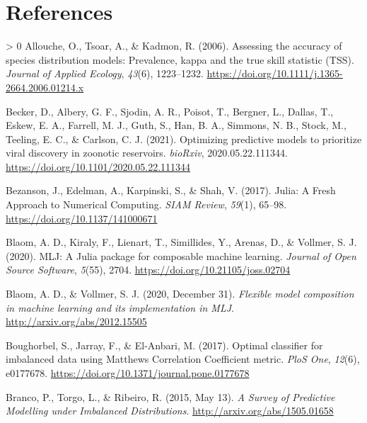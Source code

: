 \documentclass[10pt,oneside]{article}
\newlength{\cslhangindent}
\newenvironment{CSLReferences}[3] %
 {%
  \setlength{\parindent}{0pt}
  \ifodd #1 \everypar{\setlength{\hangindent}{\cslhangindent}}\ignorespaces\fi
  \ifnum #2 > 0
  \setlength{\parskip}{#2\baselineskip}
  \fi
 }%
 {}
\begin{document}
\hypertarget{references}{%
\section*{References}\label{references}}

\hypertarget{refs}{}
\begin{CSLReferences}{1}{0}
\leavevmode\hypertarget{ref-Allouche2006AssAcc}{}%
Allouche, O., Tsoar, A., \& Kadmon, R. (2006). Assessing the accuracy of
species distribution models: Prevalence, kappa and the true skill
statistic (TSS). \emph{Journal of Applied Ecology}, \emph{43}(6),
1223--1232. \url{https://doi.org/10.1111/j.1365-2664.2006.01214.x}

\leavevmode\hypertarget{ref-Becker2021OptPre}{}%
Becker, D., Albery, G. F., Sjodin, A. R., Poisot, T., Bergner, L.,
Dallas, T., Eskew, E. A., Farrell, M. J., Guth, S., Han, B. A., Simmons,
N. B., Stock, M., Teeling, E. C., \& Carlson, C. J. (2021). Optimizing
predictive models to prioritize viral discovery in zoonotic reservoirs.
\emph{bioRxiv}, 2020.05.22.111344.
\url{https://doi.org/10.1101/2020.05.22.111344}

\leavevmode\hypertarget{ref-Bezanson2017JulFre}{}%
Bezanson, J., Edelman, A., Karpinski, S., \& Shah, V. (2017). Julia: A
Fresh Approach to Numerical Computing. \emph{SIAM Review}, \emph{59}(1),
65--98. \url{https://doi.org/10.1137/141000671}

\leavevmode\hypertarget{ref-Blaom2020MljJul}{}%
Blaom, A. D., Kiraly, F., Lienart, T., Simillides, Y., Arenas, D., \&
Vollmer, S. J. (2020). MLJ: A Julia package for composable machine
learning. \emph{Journal of Open Source Software}, \emph{5}(55), 2704.
\url{https://doi.org/10.21105/joss.02704}

\leavevmode\hypertarget{ref-Blaom2020FleMod}{}%
Blaom, A. D., \& Vollmer, S. J. (2020, December 31). \emph{Flexible
model composition in machine learning and its implementation in MLJ}.
\url{http://arxiv.org/abs/2012.15505}

\leavevmode\hypertarget{ref-Boughorbel2017OptCla}{}%
Boughorbel, S., Jarray, F., \& El-Anbari, M. (2017). Optimal classifier
for imbalanced data using Matthews Correlation Coefficient metric.
\emph{PloS One}, \emph{12}(6), e0177678.
\url{https://doi.org/10.1371/journal.pone.0177678}

\leavevmode\hypertarget{ref-Branco2015SurPre}{}%
Branco, P., Torgo, L., \& Ribeiro, R. (2015, May 13). \emph{A Survey of
Predictive Modelling under Imbalanced Distributions}.
\url{http://arxiv.org/abs/1505.01658}


\end{CSLReferences}
\end{document}
